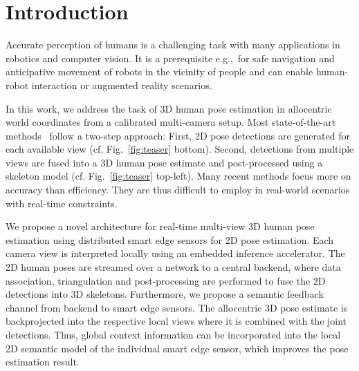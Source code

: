 \documentclass[conference]{IEEEtran}
\newcommand{\eg}{e.g.,\ }
\newcommand{\cf}{cf.\xspace}
\newcommand{\reffig}[1]{Fig.~\ref{#1}}
\begin{document}
\IEEEpeerreviewmaketitle

\section{Introduction}
\label{sec:Introduction}
Accurate perception of humans is a challenging task with many applications in robotics and computer vision. It is a prerequisite \eg for safe navigation and anticipative movement of robots in the vicinity of people and can enable human-robot interaction or augmented reality scenarios.

In this work, we address the task of 3D human pose estimation in allocentric world coordinates from a calibrated multi-camera setup.
Most state-of-the-art methods~\cite{qiu_cross_2019,pavlakos_harvesting_2017,chen_crossview_2020,remelli_lightweight_2020,dong_fast_2019} follow a two-step approach: First, 2D pose detections are generated for each available view (\cf\reffig{fig:teaser} bottom). Second, detections from multiple views are fused into a 3D human pose estimate and post-processed using a skeleton model (\cf\reffig{fig:teaser} top-left). Many recent methods focus more on accuracy than efficiency. They are thus difficult to employ in real-world scenarios with real-time constraints.

We propose a novel architecture for real-time multi-view 3D human pose estimation using distributed smart edge sensors for 2D pose estimation. Each camera view is interpreted locally using an embedded inference accelerator. The 2D human poses are streamed over a network to a central backend, where data association, triangulation and post-processing are performed to fuse the 2D detections into 3D skeletons. Furthermore, we propose a semantic feedback channel from backend to smart edge sensors. The allocentric 3D pose estimate is backprojected into the respective local views where it is combined with the joint detections. Thus, global context information can be incorporated into the local 2D semantic model of the individual smart edge sensor, which improves the pose estimation result.
\end{document}
